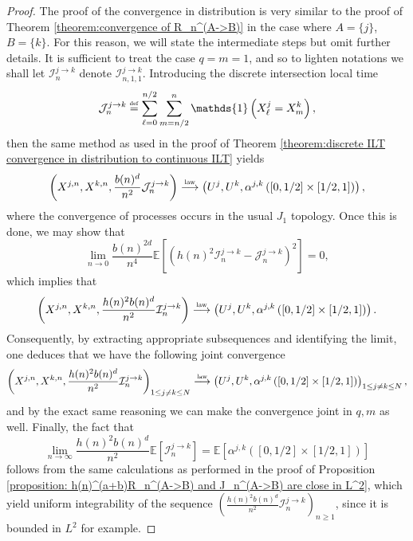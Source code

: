 \documentclass[10pt,a4paper]{amsart}
\newcommand{\I}{\mathcal I}
\newcommand{\J}{\mathcal J}
\newcommand{\EE}{\mathbb E}
\newcommand{\1}{\mathds{1}}
\newcommand{\distribution}{\stackrel{\scaleto{\mathrm{law}}{4pt}}{\longrightarrow}}
\newcommand{\eqdef}{\stackrel{\scaleto{\mathrm{def}}{3.5pt}}{=}}
\numberwithin{equation}{section}
\begin{document}
\begin{proof}
    The proof of the convergence in distribution is very similar to the proof of Theorem \ref{theorem:convergence of R_n^(A->B)} in the case where $A=\{j\}$, $B=\{k\}$. For this reason, we will state the intermediate steps but omit further details. It is sufficient to treat the case $q=m=1$, and so to lighten notations we shall let $\I_n^{j\rightarrow k}$ denote $\I_{n,1,1}^{j\rightarrow k}$. Introducing the discrete intersection local time
    \begin{equation*}
        \J_{n}^{j\rightarrow k}\eqdef\sum_{\ell=0}^{n/2}\sum_{m=n/2}^n\1\left(X_\ell^j=X_m^k\right),
    \end{equation*}
    then the same method as used in the proof of Theorem \ref{theorem:discrete ILT convergence in distribution to continuous ILT} yields
    \begin{equation*}
        \left(X^{j,n},X^{k,n},\frac{b(n)^d}{n^2}\J_n^{j\rightarrow k}\right)\distribution\left(U^j,U^k,\alpha^{j,k}\left(\left[0,1/2\right]\times\left[1/2,1\right]\right)\right),
    \end{equation*}
    where the convergence of processes occurs in the usual $J_1$ topology. Once this is done, we may show that
    \begin{equation*}
        \underset{n\rightarrow 0}\lim\frac{b(n)^{2d}}{n^4}\EE\left[\left(h(n)^2\I_n^{j\rightarrow k}-\J_n^{j\rightarrow k}\right)^2\right]=0,
    \end{equation*}
    which implies that 
    \begin{equation*}
        \left(X^{j,n},X^{k,n},\frac{h(n)^2b(n)^d}{n^2}\I_n^{j\rightarrow k}\right)\distribution\left(U^j,U^k,\alpha^{j,k}\left(\left[0,1/2\right]\times\left[1/2,1\right]\right)\right).
    \end{equation*}
    Consequently, by extracting appropriate subsequences and identifying the limit, one deduces that we have the following joint convergence
    \begin{equation*}
        \left(X^{j,n},X^{k,n},\frac{h(n)^2b(n)^d}{n^2}\I_n^{j\rightarrow k}\right)_{1\le j\ne k\le N}\distribution\left(U^j,U^k,\alpha^{j,k}\left(\left[0,1/2\right]\times\left[1/2,1\right]\right)\right)_{1\le j\ne k\le N},
    \end{equation*}
    and by the exact same reasoning we can make the convergence joint in $q,m$ as well. Finally, the fact that 
    \begin{equation*}
        \underset{n\rightarrow\infty}\lim\frac{h(n)^2b(n)^{d}}{n^2}\EE\left[\I_n^{j\rightarrow k}\right]=\EE\left[\alpha^{j,k}\left(\left[0,1/2\right]\times\left[1/2,1\right]\right)\right]
    \end{equation*}
    follows from the same calculations as performed in the proof of Proposition \ref{proposition: h(n)^(a+b)R_n^(A->B) and J_n^(A->B) are close in L^2}, which yield uniform integrability of the sequence $\left(\frac{h(n)^2b(n)^d}{n^2}\I_n^{j\rightarrow k}\right)_{n\ge1}$, since it is bounded in $L^2$ for example.
\end{proof}
\end{document}
